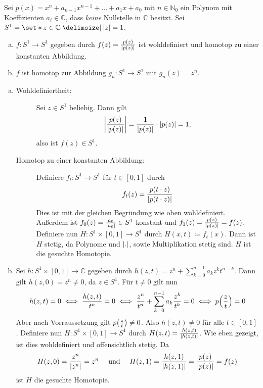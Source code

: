 Sei $p(x)= x^n + a_{n-1} x^{n-1} + \ldots + a_1 x + a_0$ mit $n \in \mathbb{N}_0$ ein Polynom mit Koeffizienten $a_i \in \mathbb{C}$, dass \emph{keine} Nullstelle in $\mathbb{C}$ besitzt. 
Sei $S^1= \set*{z \in \mathbb{C} \given \abs*{z}=1}$.
\begin{enumerate}[(a)]
	\item $f \colon S^1 \to S^1$ gegeben durch $f(z) = \frac{p(z)}{\abs*{p(z)} } $ ist wohldefiniert und homotop zu einer konstanten Abbildung.
	\item $f$ ist homotop zur Abbildung $g_n \colon S^1 \to S^1$ mit $g_n(z)= z^n$.
\end{enumerate}
\begin{enumerate}[(a)]
	\item \begin{description}
		\item[Wohldefiniertheit:] Sei $z \in S^1$ beliebig. Dann gilt
		\[
			\abs*{\frac{p(z)}{\abs*{p(z)} } } = \frac{1}{\abs*{p(z)} } \cdot \abs*{p(z)} =1,
		\]
		also ist $f(z) \in S^1$.
		\item[Homotop zu einer konstanten Abbildung:] Definiere $f_t \colon S^1 \to S^1$ für $t \in [0,1]$ durch 
		\[
			f_t(z) = \frac{p(t \cdot z)}{\abs*{p(t \cdot z)} } 
		\]
		Dies ist mit der gleichen Begründung wie oben wohldefiniert. 
		Außerdem ist $f_0(z)= \frac{a_0}{\abs*{a_0} } \in S^1 $ konstant und $f_1(z)= \frac{p(z)}{\abs*{p(z)} }=f(z)$. 
		Definiere nun $H \colon S^1 \times [0,1] \to S^1$ durch $H(x,t) \coloneqq f_t(x)$. 
		Dann ist $H$ stetig, da Polynome und $\abs*{.} $, sowie Multiplikation stetig sind. 
		$H$ ist die gesuchte Homotopie.
	\end{description}
	\item Sei $h \colon S^1 \times [0,1] \to \mathbb{C}$ gegeben durch $h(z,t) = z^n + \sum_{k=0}^{n-1} a_k z^k t^{n-k}$. 
	Dann gilt $h(z,0)=z^n \not= 0$, da $z \in S^1$.
	Für $t \neq 0$ gilt nun
	\begin{align*}
		h(z,t) = 0 \iff \frac{h(z,t)}{t^n} = 0 \iff \frac{z^n}{t^n} + \sum_{k=0}^{n-1} a_k \frac{z^k}{t^k} = 0 \iff p \enbrace*{\frac{z}{t}} = 0
	\end{align*}
	Aber nach Vorraussetzung gilt $p \enbrace*{\frac{z}{t}} \neq 0$. 
	Also $h(z,t) \neq 0$ für alle $t \in [0,1]$. 
	Definiere nun $H \colon S^1 \times [0,1]\to S^1$ durch $H(z,t) = \frac{h(z,t)}{\abs*{h(z,t)}}$. 
	Wie eben gezeigt, ist dies wohldefiniert und offensichtlich stetig. Da
	\[
		H(z,0) = \frac{z^n}{\abs*{z^n} } = z^n \quad \text{ und } \quad H(z,1) = \frac{h(z,1)}{\abs*{h(z,1)} } = \frac{p(z)}{\abs*{p(z)} } =f(z)
	\]
	ist $H$ die gesuchte Homotopie. \qedhere
\end{enumerate}
